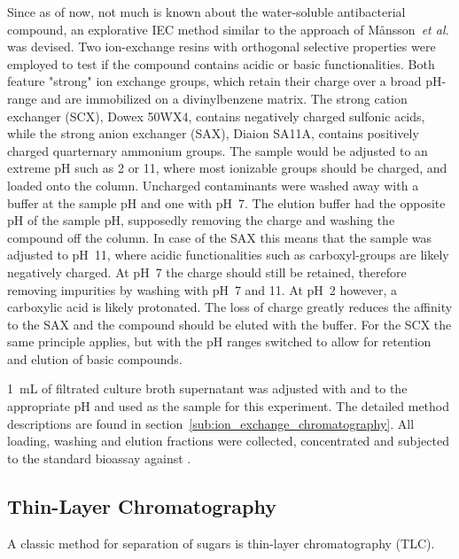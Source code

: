 	Since as of now, not much is known about the water-soluble antibacterial compound, an explorative IEC method similar to the approach of M{\aa}nsson~\textit{et al.} was devised.\autocite{Mansson2010}
	Two ion-exchange resins with orthogonal selective properties were employed to test if the compound contains acidic or basic functionalities.
	Both feature "strong" ion exchange groups, which retain their charge over a broad pH-range and are immobilized on a divinylbenzene matrix.
	The strong cation exchanger (SCX), Dowex 50WX4, contains negatively charged sulfonic acids, while the strong anion exchanger (SAX), Diaion SA11A, contains positively charged quarternary ammonium groups.
	The sample would be adjusted to an extreme pH such as 2 or 11, where most ionizable groups should be charged, and loaded onto the column.
	Uncharged contaminants were washed away with a buffer at the sample pH and one with pH~7.
	The elution buffer had the opposite pH of the sample pH, supposedly removing the charge and washing the compound off the column.
	In case of the SAX this means that the sample was adjusted to pH~11, where acidic functionalities such as carboxyl-groups are likely negatively charged.
	At pH~7 the charge should still be retained, therefore removing impurities by washing with pH~7 and 11.
	At pH~2 however, a carboxylic acid is likely protonated.
	The loss of charge greatly reduces the affinity to the SAX and the compound should be eluted with the buffer.
	For the SCX the same principle applies, but with the pH ranges switched to allow for retention and elution of basic compounds.
	
	\SI{1}{\milli\liter} of filtrated culture broth supernatant was adjusted with  and  to the appropriate pH and used as the sample for this experiment.
	The detailed method descriptions are found in section~\ref{sub:ion_exchange_chromatography}.
	All loading, washing and elution fractions were collected, concentrated and subjected to the standard bioassay against \coli.
	
	

\subsection{Thin-Layer Chromatography} %
\label{sub:results_thin_layer_chromatography}
    
    
    A classic method for separation of sugars is thin-layer chromatography (TLC).

